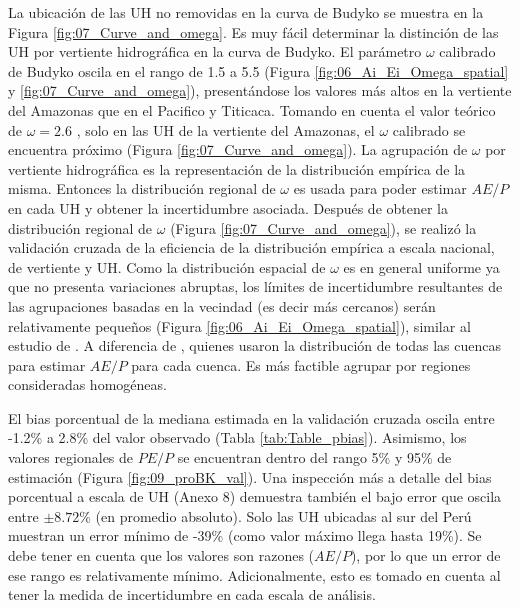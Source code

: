\documentclass[12pt]{article}
\begin{document}

\thispagestyle{empty}

La ubicación de las UH no removidas en la curva de Budyko se muestra en la Figura \ref{fig:07_Curve_and_omega}. Es muy fácil determinar la distinción de las UH por vertiente hidrográfica en la curva de Budyko. El parámetro $\omega$ calibrado de Budyko oscila en el rango de 1.5 a 5.5 (Figura \ref{fig:06_Ai_Ei_Omega_spatial} y \ref{fig:07_Curve_and_omega}), presentándose los valores más altos en la vertiente del Amazonas que en el Pacifico y Titicaca. Tomando en cuenta el valor teórico de $\omega = 2.6$ \citep{Fu1981}, solo en las UH de la vertiente del Amazonas, el $\omega$ calibrado se encuentra próximo (Figura \ref{fig:07_Curve_and_omega}). La agrupación de $\omega$ por vertiente hidrográfica es la representación de la distribución empírica de la misma. Entonces la distribución regional de $\omega$ es usada para poder estimar $AE/P$ en cada UH y obtener la incertidumbre asociada.
\clearpage
Después de obtener la distribución regional de $\omega$ (Figura \ref{fig:07_Curve_and_omega}), se realizó la validación cruzada de la eficiencia de la distribución empírica a escala nacional, de vertiente y UH. Como la distribución espacial de $\omega$ es en general uniforme ya que no presenta variaciones abruptas, los límites de incertidumbre resultantes de las agrupaciones basadas en la vecindad (es decir más cercanos) serán relativamente pequeños (Figura \ref{fig:06_Ai_Ei_Omega_spatial}), similar al estudio de \citet{Singh2015}. A diferencia de \citet{Greve2015}, quienes usaron la distribución de todas las cuencas para estimar $AE/P$ para cada cuenca. Es más factible agrupar por regiones consideradas homogéneas.



\thispagestyle{empty}

El bias porcentual de la mediana estimada en la validación cruzada oscila entre -1.2\% a 2.8\% del valor observado (Tabla \ref{tab:Table_pbias}). Asimismo, los valores regionales de $PE/P$ se encuentran dentro del rango 5\% y 95\% de estimación (Figura \ref{fig:09_proBK_val}). Una inspección más a detalle del bias porcentual a escala de UH (Anexo 8) demuestra también el bajo error que oscila entre $\pm8.72\%$ (en promedio absoluto). Solo las UH ubicadas al sur del Perú muestran un error mínimo de -39\% (como valor máximo llega hasta 19\%). Se debe tener en cuenta que los valores son razones ($AE/P$), por lo que un error de ese rango es relativamente mínimo. Adicionalmente, esto es tomado en cuenta al tener la medida de incertidumbre en cada escala de análisis.
\end{document}
